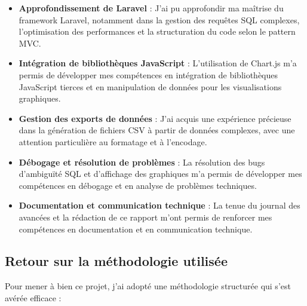 \documentclass[a4paper,12pt]{report}
\begin{document}
  \begin{itemize}
    \item \textbf{Approfondissement de Laravel} : J'ai pu approfondir ma maîtrise du framework Laravel, notamment dans la gestion des requêtes SQL complexes, l'optimisation des performances et la structuration du code selon le pattern MVC.
    
    \item \textbf{Intégration de bibliothèques JavaScript} : L'utilisation de Chart.js m'a permis de développer mes compétences en intégration de bibliothèques JavaScript tierces et en manipulation de données pour les visualisations graphiques.
    
    \item \textbf{Gestion des exports de données} : J'ai acquis une expérience précieuse dans la génération de fichiers CSV à partir de données complexes, avec une attention particulière au formatage et à l'encodage.
    
    \item \textbf{Débogage et résolution de problèmes} : La résolution des bugs d'ambiguïté SQL et d'affichage des graphiques m'a permis de développer mes compétences en débogage et en analyse de problèmes techniques.
    
    \item \textbf{Documentation et communication technique} : La tenue du journal des avancées et la rédaction de ce rapport m'ont permis de renforcer mes compétences en documentation et en communication technique.
  \end{itemize}

\newpage
  \subsection{Retour sur la méthodologie utilisée}
  Pour mener à bien ce projet, j'ai adopté une méthodologie structurée qui s'est avérée efficace :
  
\end{document}
